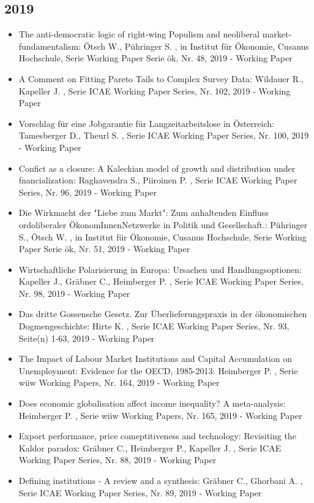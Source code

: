  \subsection{2019} 
 \begin{itemize} 
	 \item The anti-democratic logic of right-wing Populism and neoliberal market-fundamentalism: Ötsch W., Pühringer S. , in Institut für Ökonomie, Cusanus Hochschule, Serie Working Paper Serie ök, Nr. 48, 2019 - Working Paper
	 \item A Comment on Fitting Pareto Tails to Complex Survey Data: Wildauer R., Kapeller J. , Serie ICAE Working Paper Series, Nr. 102, 2019 - Working Paper
	 \item Vorschlag für eine Jobgarantie für Langzeitarbeitslose in Österreich: Tamesberger D., Theurl S. , Serie ICAE Working Paper Series, Nr. 100, 2019 - Working Paper
	 \item Confict as a closure: A Kaleckian model of growth and distribution under fnancialization: Raghavendra S., Piiroinen P. , Serie ICAE Working Paper Series, Nr. 96, 2019 - Working Paper
	 \item Die Wirkmacht der "Liebe zum Markt": Zum anhaltenden Einfluss ordoliberaler ÖkonomInnenNetzwerke in Politik und Gesellschaft.: Pühringer S., Ötsch W. , in Institut für Ökonomie, Cusanus Hochschule, Serie Working Paper Serie ök, Nr. 51, 2019 - Working Paper
	 \item Wirtschaftliche Polarisierung in Europa: Ursachen und Handlungsoptionen: Kapeller J., Gräbner C., Heimberger P. , Serie ICAE Working Paper Series, Nr. 98, 2019 - Working Paper
	 \item Das dritte Gossensche Gesetz. Zur Überlieferungspraxis in der ökonomischen Dogmengeschichte: Hirte K. , Serie ICAE Working Paper Series, Nr. 93, Seite(n) 1-63, 2019 - Working Paper
	 \item The Impact of Labour Market Institutions and Capital Accumulation on Unemployment: Evidence for the OECD, 1985-2013: Heimberger P. , Serie wiiw Working Papers, Nr. 164, 2019 - Working Paper
	 \item Does economic globalisation affect income inequality? A meta-analysis: Heimberger P. , Serie wiiw Working Papers, Nr. 165, 2019 - Working Paper
	 \item Export performance, price comeptitiveness and technology: Revisiting the Kaldor paradox: Gräbner C., Heimberger P., Kapeller J. , Serie ICAE Working Paper Series, Nr. 88, 2019 - Working Paper
	 \item Defining institutions - A review and a synthesis: Gräbner C., Ghorbani A. , Serie ICAE Working Paper Series, Nr. 89, 2019 - Working Paper

\end{itemize}
